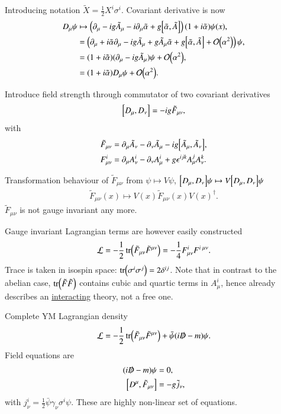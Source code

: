Introducing notation $\tilde{X} = \frac{1}{2} X^i \sigma^i $. Covariant derivative is now  
\begin{align}
   D_\mu \psi &\mapsto \left( \partial_\mu - ig \tilde{A}_\mu - i \partial_\mu \tilde{\alpha} + g \comm{\tilde{\alpha}}{\tilde A} \right) (1 + i \tilde{\alpha}) \psi(x), \notag \\
              &= \left(\partial_\mu + i \tilde{\alpha}\partial_\mu - ig \tilde{A}_\mu + g \tilde{A}_\mu \tilde{\alpha} + g \comm{\tilde{\alpha}}{\tilde{A}} + \order{\alpha^2}\right) \psi, \notag \\
              &= (1 + i \tilde{\alpha}) (\partial_\mu - ig \tilde{A}_\mu) \psi + \order{\alpha^2}, \notag \\
              &= (1+ i\tilde{\alpha}) D_\mu \psi + \order{\alpha^2}.
\end{align}

Introduce field strength through  commutator of two covariant derivatives
\begin{align}
   \comm{D_\mu}{D_\nu} = -ig \tilde{F}_{\mu\nu},
\end{align}
with
\begin{align}
   \tilde{F}_{\mu\nu} &= \partial_\mu \tilde{A}_\nu - \partial_\nu \tilde{A}_\mu - ig \comm{\tilde{A}_\mu}{\tilde{A}_\nu}, \\
   F_{\mu\nu}^i &= \partial_\mu A_\nu^i - \partial_\nu A_\mu^i + g \epsilon^{ijk} A^j_\mu A^k_\nu.
\end{align} 

Transformation behaviour of $\tilde{F}_{\mu\nu}$ from $\psi \mapsto V\psi$, $\comm{D_\mu}{D_\nu} \psi \mapsto V \comm{D_\mu}{D_\nu} \psi$
\begin{align*}
   \tilde{F}_{\mu\nu}(x) \mapsto V(x) \tilde{F}_{\mu\nu}(x) V(x)^\dagger.
\end{align*}
$\tilde{F}_{\mu\nu}$ is not gauge invariant any more.

Gauge invariant Lagrangian terms are however easily constructed
\begin{align}
   \mathcal{L} = -\frac{1}{2} \tr (\tilde{F}_{\mu\nu} \tilde{F}^{\mu\nu}) =  -\frac{1}{4} F^i_{\mu\nu} F^{i \; \mu\nu}.
\end{align}
Trace is taken in isospin space: $\tr(\sigma^i \sigma^j) = 2\delta^{ij}$. Note that in contrast to the abelian case, $\tr(\tilde{F}\tilde{F})$ contains cubic and quartic terms in $A_\mu^i$, hence already describes an \underline{interacting} theory, not a free one.

Complete YM Lagrangian density
\begin{align}
   \mathcal{L} = - \frac{1}{2} \tr (\tilde{F}_{\mu\nu} \tilde{F}^{\mu\nu}) + \bar\psi ( i \slashed{D} - m) \psi.
\end{align}
Field equations are 
\begin{align*}
   (i\slashed{D} - m) \psi  &= 0, \\
   \comm{D^\mu}{\tilde{F}_{\mu\nu}} &= -g \tilde{j}_\nu,
\end{align*}
with $j_\nu^i =\frac{1}{2} \bar\psi \gamma_\nu \sigma^i \psi $. These are highly non-linear set of equations.

